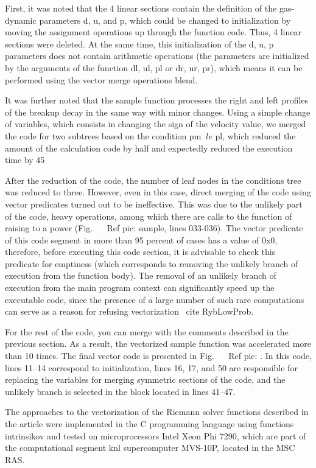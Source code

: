 \documentclass[
11pt,%
tightenlines,%
twoside,%
onecolumn,%
nofloats,%
nobibnotes,%
nofootinbib,%
superscriptaddress,%
noshowpacs,%
centertags]%
{revtex4}
\begin{document}
First, it was noted that the 4 linear sections contain the definition of the gas-dynamic parameters d, u, and p, which could be changed to initialization by moving the assignment operations up through the function code. Thus, 4 linear sections were deleted. At the same time, this initialization of the d, u, p parameters does not contain arithmetic operations (the parameters are initialized by the arguments of the function dl, ul, pl or dr, ur, pr), which means it can be performed using the vector merge operations blend.

It was further noted that the sample function processes the right and left profiles of the breakup decay in the same way with minor changes. Using a simple change of variables, which consists in changing the sign of the velocity value, we merged the code for two subtrees based on the condition pm $ \ le $ pl, which reduced the amount of the calculation code by half and expectedly reduced the execution time by 45%

After the reduction of the code, the number of leaf nodes in the conditions tree was reduced to three. However, even in this case, direct merging of the code using vector predicates turned out to be ineffective. This was due to the unlikely part of the code, heavy operations, among which there are calls to the function of raising to a power (Fig. ~ \ Ref {pic: sample}, lines 033-036). The vector predicate of this code segment in more than 95 percent of cases has a value of 0x0, therefore, before executing this code section, it is advisable to check this predicate for emptiness (which corresponds to removing the unlikely branch of execution from the function body). The removal of an unlikely branch of execution from the main program context can significantly speed up the executable code, since the presence of a large number of such rare computations can serve as a reason for refusing vectorization \ cite {RybLowProb}.

For the rest of the code, you can merge with the comments described in the previous section. As a result, the vectorized sample function was accelerated more than 10 times. The final vector code is presented in Fig. ~ \ Ref {pic: }. In this code, lines 11–14 correspond to initialization, lines 16, 17, and 50 are responsible for replacing the variables for merging symmetric sections of the code, and the unlikely branch is selected in the block located in lines 41–47.

The approaches to the vectorization of the Riemann solver functions described in the article were implemented in the C programming language using functions intrinsikov and tested on microprocessors Intel Xeon Phi 7290, which are part of the computational segment knl supercomputer MVS-10P, located in the MSC RAS.
\end{document}
